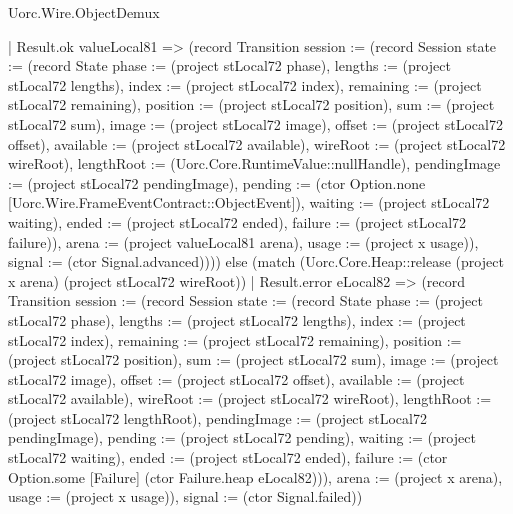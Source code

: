 \begin{lexlean}{Uorc.Wire.ObjectDemux}
\begin{semanticmodule}
{      | Result.ok valueLocal81 => (record Transition {session := (record Session {state := (record State {phase := (project stLocal72 phase), lengths := (project stLocal72 lengths), index := (project stLocal72 index), remaining := (project stLocal72 remaining), position := (project stLocal72 position), sum := (project stLocal72 sum), image := (project stLocal72 image), offset := (project stLocal72 offset), available := (project stLocal72 available), wireRoot := (project stLocal72 wireRoot), lengthRoot := (Uorc.Core.RuntimeValue::nullHandle), pendingImage := (project stLocal72 pendingImage), pending := (ctor Option.none [Uorc.Wire.FrameEventContract::ObjectEvent]), waiting := (project stLocal72 waiting), ended := (project stLocal72 ended), failure := (project stLocal72 failure)}), arena := (project valueLocal81 arena), usage := (project x usage)}), signal := (ctor Signal.advanced)}))) else (match (Uorc.Core.Heap::release (project x arena) (project stLocal72 wireRoot))
      | Result.error eLocal82 => (record Transition {session := (record Session {state := (record State {phase := (project stLocal72 phase), lengths := (project stLocal72 lengths), index := (project stLocal72 index), remaining := (project stLocal72 remaining), position := (project stLocal72 position), sum := (project stLocal72 sum), image := (project stLocal72 image), offset := (project stLocal72 offset), available := (project stLocal72 available), wireRoot := (project stLocal72 wireRoot), lengthRoot := (project stLocal72 lengthRoot), pendingImage := (project stLocal72 pendingImage), pending := (project stLocal72 pending), waiting := (project stLocal72 waiting), ended := (project stLocal72 ended), failure := (ctor Option.some [Failure] (ctor Failure.heap eLocal82))}), arena := (project x arena), usage := (project x usage)}), signal := (ctor Signal.failed)})
}
\end{semanticmodule}
\end{lexlean}
